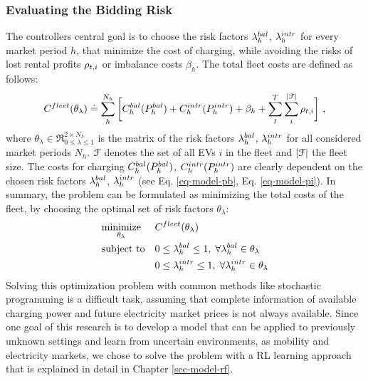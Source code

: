 \documentclass[a4paper, 12pt]{article}
\begin{document}
\subsubsection{Evaluating the Bidding Risk}
\label{sec:orgc0b3bd2}
The controllers central goal is to choose the risk factors \(\lambda^{bal}_{h}\), \(\lambda^{intr}_{h}\)
for every market period \(h\), that minimize the cost of charging, while avoiding
the risks of lost rental profits \(\rho_{t,i}\) or imbalance costs \(\beta_h\). The total
fleet costs are defined as follows:
\begin{equation} \label{eq-model-fleetcosts}
    C^{fleet}_{}(\theta_{\lambda}) \doteq \sum^{N_h}_h
    \bigg[ C^{bal}_{h}(P^{bal}_{h}) + C^{intr}_{h}(P^{intr}_{h}) + \beta_{h}
    + \sum_t^{T} \sum_i^{|\cal{F}|} \rho_{t,i} \bigg] \text{ ,}
\end{equation}
where \(\theta_{\lambda}\!\in\!\Re_{0 \leq \lambda \leq 1}^{2 \times N_h}\) is the
matrix of the risk factors \(\lambda^{bal}_{h}\), \(\lambda^{intr}_{h}\) for all considered market periods
\(N_h\). \({\cal{F}}\) denotes the set of all EVs \(i\) in the fleet and \(|\cal{F}|\) the fleet
size. The costs for charging \(C^{bal}_{h}(P^{bal}_{h})\), \(C^{intr}_{h}(P^{intr}_{h})\) are clearly
dependent on the chosen risk factors \(\lambda^{bal}_{h}\), \(\lambda^{intr}_{h}\) (see Eq.
\ref{eq-model-pb}, Eq. \ref{eq-model-pi}). In summary, the problem can be formulated
as minimizing the total costs of the fleet, by choosing the optimal set of risk
factors \(\theta_{\lambda}\):
\begin{equation}
\begin{aligned}
    & \underset{\theta_{\lambda}}{\text{minimize}}
    && C^{fleet}_{}(\theta_{\lambda}) \\
    & \text{subject to}
    && 0 \leq \lambda^{bal}_{h} \leq 1, \; \forall \lambda^{bal}_{h} \in \theta_{\lambda}\\
    &&& 0 \leq \lambda^{intr}_{h} \leq 1, \; \forall \lambda^{intr}_{h} \in \theta_{\lambda}\\
\end{aligned}
\end{equation}
Solving this optimization problem with common methods like stochastic
programming is a difficult task, assuming that complete information of available
charging power and future electricity market prices is not always available.
Since one goal of this research is to develop a model that can be applied to
previously unknown settings and learn from uncertain environments, as mobility
and electricity markets, we chose to solve the problem with a RL learning
approach that is explained in detail in Chapter \ref{sec-model-rf}.
\end{document}

